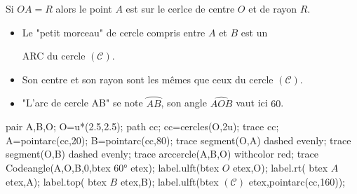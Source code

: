 \begin{propriete}[\admise]
    Si $OA=R$ alors le point $A$ est sur le cerlce de centre $O$ et de rayon $R$.
\end{propriete}

\begin{minipage}{0.75\linewidth}
    \begin{definition}
        \begin{itemize}
            \item Le "petit morceau" de cercle compris entre $A$ et $B$ est un
            
            {\red ARC du cercle $(\mathscr C)$}.
            \item Son centre et son rayon sont les mêmes que ceux du cercle $(\mathscr C)$.
            \item "L'arc de cercle AB" se note $\wideparen{AB}$, son angle $\widehat{AOB}$ vaut ici $60$\degre.
        \end{itemize}
    \end{definition}
\end{minipage}
\begin{minipage}{0.3\linewidth}
    \begin{Geometrie}[CoinHD={(5u,5u)}]
        pair A,B,O;
        O=u*(2.5,2.5);
        path cc;
        cc=cercles(O,2u);
        trace cc;
        A=pointarc(cc,20);
        B=pointarc(cc,80);
        trace segment(O,A) dashed evenly;
        trace segment(O,B) dashed evenly;
        trace arccercle(A,B,O) withcolor red;
        trace Codeangle(A,O,B,0,btex $\ang{60}$ etex);
        label.ulft(btex $O$ etex,O);
        label.rt(  btex $A$ etex,A);
        label.top( btex $B$ etex,B);
        label.ulft(btex $(\mathscr C)$ etex,pointarc(cc,160));
    \end{Geometrie} 
\end{minipage} 
    